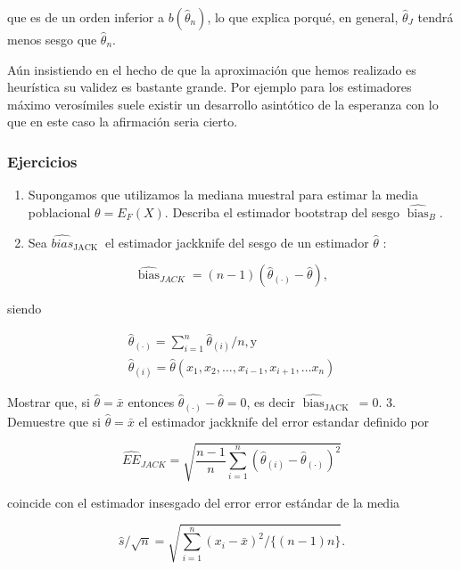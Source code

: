 \documentclass[
]{article}
\providecommand{\tightlist}{%
  \setlength{\itemsep}{0pt}\setlength{\parskip}{0pt}}
\begin{document}
que es de un orden inferior a \(b\left(\hat{\theta}_{n}\right)\), lo que explica porqué, en general, \(\hat{\theta}_{J}\) tendrá menos sesgo que \(\hat{\theta}_{n}\).

Aún insistiendo en el hecho de que la aproximación que hemos realizado es heurística su validez es bastante grande. Por ejemplo para los estimadores máximo verosímiles suele existir un desarrollo asintótico de la esperanza con lo que en este caso la afirmación seria cierto.

\subsubsection{Ejercicios}\label{ejercicios-1}

\begin{enumerate}
\def\labelenumi{\arabic{enumi}.}
\tightlist
\item
  Supongamos que utilizamos la mediana muestral para estimar la media poblacional \(\theta=E_{F}(X)\). Describa el estimador bootstrap del sesgo \(\widehat{\operatorname{bias}}_{B}\).
\item
  Sea \(\widehat{b i a s}_{\text {JACK }}\) el estimador jackknife del sesgo de un estimador \(\hat{\theta}\) :
\end{enumerate}

\[
\widehat{\operatorname{bias}}_{J A C K}=(n-1)\left(\hat{\theta}_{(\cdot)}-\hat{\theta}\right),
\]

siendo

\[
\begin{array}{r}
\hat{\theta}_{(\cdot)}=\sum_{i=1}^{n} \hat{\theta}_{(i)} / n, \mathrm{y} \\
\hat{\theta}_{(i)}=\hat{\theta}\left(x_{1}, x_{2}, \ldots, x_{i-1}, x_{i+1}, \ldots x_{n}\right)
\end{array}
\]

Mostrar que, si \(\hat{\theta}=\bar{x}\) entonces \(\hat{\theta}_{(\cdot)}-\hat{\theta}=0\), es decir \(\widehat{\operatorname{bias}}_{\text {JACK }}=0\).
3. Demuestre que si \(\hat{\theta}=\bar{x}\) el estimador jackknife del error estandar definido por

\[
\widehat{E E}_{J A C K}=\sqrt{\frac{n-1}{n} \sum_{i=1}^{n}\left(\hat{\theta}_{(i)}-\hat{\theta}_{(\cdot)}\right)^{2}}
\]

coincide con el estimador insesgado del error error estándar de la media

\[
\hat{s} / \sqrt{n}=\sqrt{\sum_{i=1}^{n}\left(x_{i}-\bar{x}\right)^{2} /\{(n-1) n\}} .
\]
\end{document}
